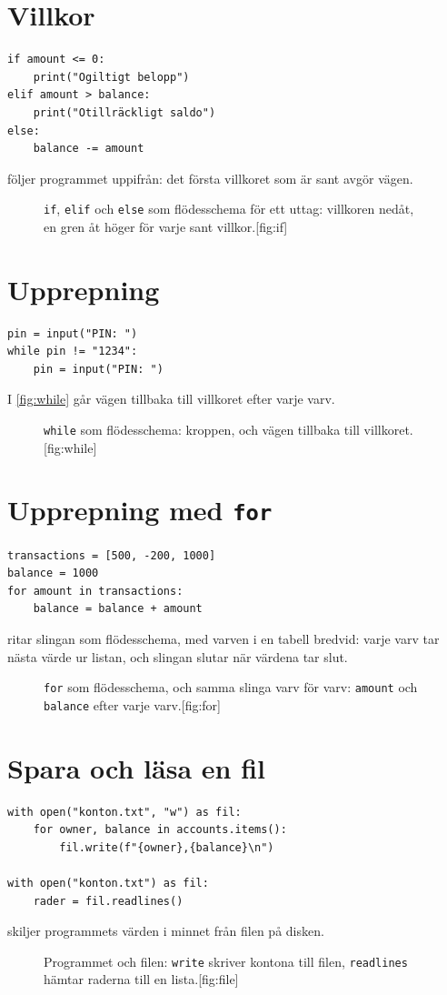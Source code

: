 \documentclass[a4paper,10pt,oneside,openright,
               oldfontcommands]{memoir}
\newcommand{\entry}[3]{%
  \begin{figure}[htbp]
    \begin{sidecaption}{#2}[fig:#1]
      #3
    \end{sidecaption}
  \end{figure}
}
\begin{document}
\section{Villkor}

\begin{verbatim}
if amount <= 0:
    print("Ogiltigt belopp")
elif amount > balance:
    print("Otillräckligt saldo")
else:
    balance -= amount
\end{verbatim}
 följer programmet uppifrån: det första villkoret som är
sant avgör vägen.
\entry{if}{\texttt{if}, \texttt{elif} och \texttt{else} som
  flödesschema för ett uttag: villkoren nedåt, en gren åt höger för
  varje sant villkor.}{\figIf}

\section{Upprepning}

\begin{verbatim}
pin = input("PIN: ")
while pin != "1234":
    pin = input("PIN: ")
\end{verbatim}
I \cref{fig:while} går vägen tillbaka till villkoret efter varje varv.
\entry{while}{\texttt{while} som flödesschema: kroppen, och vägen
  tillbaka till villkoret.}{\figWhile}

\section{Upprepning med \texttt{for}}

\begin{verbatim}
transactions = [500, -200, 1000]
balance = 1000
for amount in transactions:
    balance = balance + amount
\end{verbatim}
 ritar slingan som flödesschema, med varven i en tabell
bredvid: varje varv tar nästa värde ur listan, och slingan slutar när
värdena tar slut.
\entry{for}{\texttt{for} som flödesschema, och samma slinga varv för
  varv: \texttt{amount} och \texttt{balance} efter varje
  varv.}{\figFor\hspace{1.5em}\tabFor}

\section{Spara och läsa en fil}

\begin{verbatim}
with open("konton.txt", "w") as fil:
    for owner, balance in accounts.items():
        fil.write(f"{owner},{balance}\n")

with open("konton.txt") as fil:
    rader = fil.readlines()
\end{verbatim}
 skiljer programmets värden i minnet från filen på
disken.
\entry{file}{Programmet och filen: \texttt{write} skriver kontona till
  filen, \texttt{readlines} hämtar raderna till en lista.}{\figFile}
\end{document}
